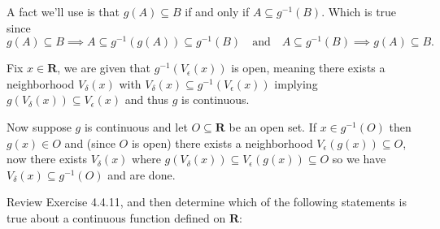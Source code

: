 \begin{solution}
  A fact we'll use is that $g(A) \subseteq B$ if and only if $A \subseteq g^{-1}(B)$. Which is true since 
  $$
  g(A) \subseteq B \implies A \subseteq g^{-1}(g(A)) \subseteq g^{-1}(B)
  \quad\text{and}\quad
  A \subseteq g^{-1}(B) \implies g(A) \subseteq B.
  $$

  Fix $x \in \mathbf{R}$, we are given that $g^{-1}(V_\epsilon(x))$ is open, meaning there exists a neighborhood $V_\delta(x)$ with $V_\delta(x) \subseteq g^{-1}(V_\epsilon(x))$ implying $g(V_\delta(x)) \subseteq V_\epsilon(x)$ and thus $g$ is continuous.

  Now suppose $g$ is continuous and let $O \subseteq \mathbf{R}$ be an open set. If $x \in g^{-1}(O)$ then $g(x) \in O$ and (since $O$ is open) there exists a neighborhood $V_\epsilon(g(x)) \subseteq O$, now there exists $V_\delta(x)$ where $g(V_\delta(x)) \subseteq V_\epsilon(g(x)) \subseteq O$ so we have $V_\delta(x) \subseteq g^{-1}(O)$ and are done.
\end{solution}

\begin{exercise}
  Review Exercise 4.4.11, and then determine which of the following statements is true about a continuous function defined on $\mathbf{R}$:
\end{exercise}

\begin{solution}
\end{solution}

